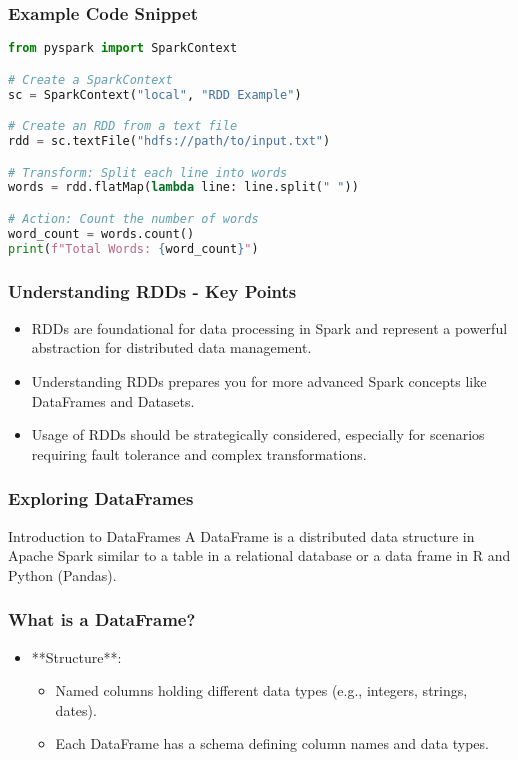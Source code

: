 \documentclass[aspectratio=169]{beamer}
\begin{document}
\begin{frame}[fragile]
    \frametitle{Example Code Snippet}
    \begin{lstlisting}[language=Python]
from pyspark import SparkContext

# Create a SparkContext
sc = SparkContext("local", "RDD Example")

# Create an RDD from a text file
rdd = sc.textFile("hdfs://path/to/input.txt")

# Transform: Split each line into words
words = rdd.flatMap(lambda line: line.split(" "))

# Action: Count the number of words
word_count = words.count()
print(f"Total Words: {word_count}") 
    \end{lstlisting}
\end{frame}

\begin{frame}[fragile]
    \frametitle{Understanding RDDs - Key Points}
    \begin{itemize}
        \item RDDs are foundational for data processing in Spark and represent a powerful abstraction for distributed data management.
        \item Understanding RDDs prepares you for more advanced Spark concepts like DataFrames and Datasets.
        \item Usage of RDDs should be strategically considered, especially for scenarios requiring fault tolerance and complex transformations.
    \end{itemize}
\end{frame}

\begin{frame}
    \frametitle{Exploring DataFrames}
    \begin{block}{Introduction to DataFrames}
        A DataFrame is a distributed data structure in Apache Spark similar to a table in a relational database or a data frame in R and Python (Pandas).
    \end{block}
\end{frame}

\begin{frame}
    \frametitle{What is a DataFrame?}
    \begin{itemize}
        \item **Structure**: 
            \begin{itemize}
                \item Named columns holding different data types (e.g., integers, strings, dates).
                \item Each DataFrame has a schema defining column names and data types.
            \end{itemize}
    \end{itemize}
\end{frame}
\end{document}
